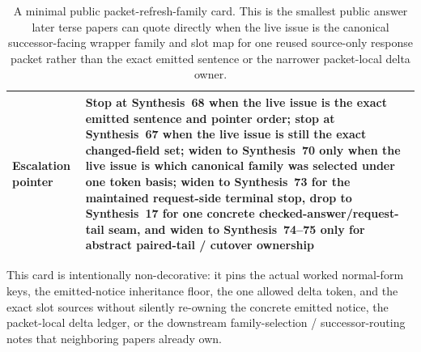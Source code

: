 \documentclass[11pt]{article}
\begin{document}
\begin{table}[t]
\begin{tabularx}{\linewidth}{@{}lX@{}}
Escalation pointer & Stop at Synthesis~68 when the live issue is the exact emitted sentence and pointer order; stop at Synthesis~67 when the live issue is still the exact changed-field set; widen to Synthesis~70 only when the live issue is which canonical family was selected under one token basis; widen to Synthesis~73 for the maintained request-side terminal stop, drop to Synthesis~17 for one concrete checked-answer/request-tail seam, and widen to Synthesis~74--75 only for abstract paired-tail / cutover ownership \\
\bottomrule
\end{tabularx}
\caption{A minimal public packet-refresh-family card. This is the smallest public answer later terse papers can quote directly when the live issue is the canonical successor-facing wrapper family and slot map for one reused source-only response packet rather than the exact emitted sentence or the narrower packet-local delta owner.}
\label{tab:minimal-public-packet-refresh-family-card}
\end{table}

This card is intentionally non-decorative: it pins the actual worked normal-form keys, the emitted-notice inheritance floor, the one allowed delta token, and the exact slot sources without silently re-owning the concrete emitted notice, the packet-local delta ledger, or the downstream family-selection / successor-routing notes that neighboring papers already own.\cite{series:workedexample}
\end{document}
